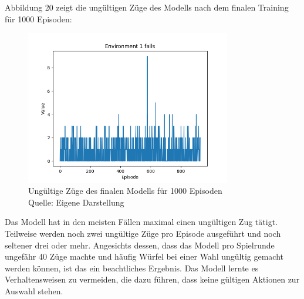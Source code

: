 Abbildung 20 zeigt die ungültigen Züge des Modells nach dem finalen Training für 1000 Episoden:
\nopagebreak
\begin{figure}[H]
	\centering
	\includegraphics[width=0.8\textwidth]{Bilder/finalf1}
	\caption[Ungültige Züge des finalen Modells für 1000 Episoden]{Ungültige Züge des finalen Modells für 1000 Episoden\\ Quelle: Eigene Darstellung}
\end{figure}

Das Modell hat in den meisten Fällen maximal einen ungültigen Zug tätigt. Teilweise werden noch zwei ungültige Züge pro Episode ausgeführt und noch seltener drei oder mehr. Angesichts dessen, dass das Modell pro Spielrunde ungefähr 40 Züge machte und häufig Würfel bei einer Wahl ungültig gemacht werden können, ist das ein beachtliches Ergebnis. Das Modell lernte es Verhaltensweisen zu vermeiden, die dazu führen, dass keine gültigen Aktionen zur Auswahl stehen.\\

